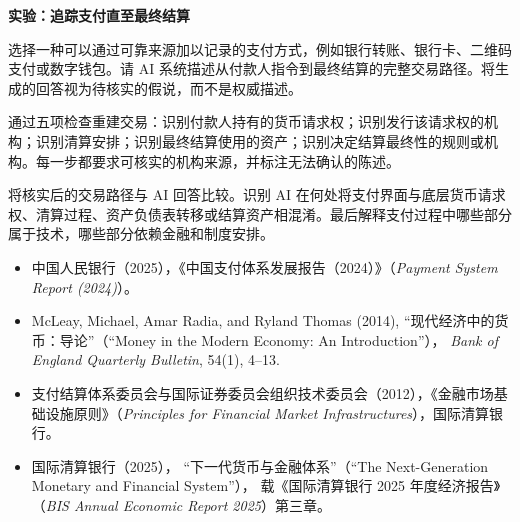 

\textbf{实验：追踪支付直至最终结算}

选择一种可以通过可靠来源加以记录的支付方式，例如银行转账、银行卡、二维码支付或数字钱包。请 AI 系统描述从付款人指令到最终结算的完整交易路径。将生成的回答视为待核实的假说，而不是权威描述。

通过五项检查重建交易：识别付款人持有的货币请求权；识别发行该请求权的机构；识别清算安排；识别最终结算使用的资产；识别决定结算最终性的规则或机构。每一步都要求可核实的机构来源，并标注无法确认的陈述。

将核实后的交易路径与 AI 回答比较。识别 AI 在何处将支付界面与底层货币请求权、清算过程、资产负债表转移或结算资产相混淆。最后解释支付过程中哪些部分属于技术，哪些部分依赖金融和制度安排。


\begin{itemize}

\item 中国人民银行（2025），《中国支付体系发展报告（2024）》（\emph{Payment System Report (2024)}）。

\item McLeay, Michael, Amar Radia, and Ryland Thomas (2014),
“现代经济中的货币：导论”（``Money in the Modern Economy: An Introduction''），
\emph{Bank of England Quarterly Bulletin}, 54(1), 4--13.

\item 支付结算体系委员会与国际证券委员会组织技术委员会（2012），《金融市场基础设施原则》（\emph{Principles for Financial Market Infrastructures}），国际清算银行。




\item 国际清算银行（2025），
“下一代货币与金融体系”（``The Next-Generation Monetary and Financial System''），
载《国际清算银行 2025 年度经济报告》（\emph{BIS Annual Economic Report 2025}）第三章。

\end{itemize}


